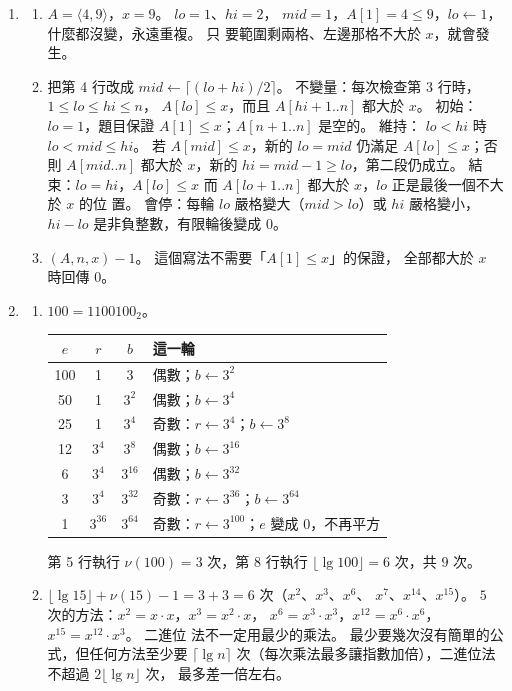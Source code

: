 \begin{enumerate}
\item
\begin{enumerate}
\item $A = \langle 4, 9 \rangle$，$x = 9$。 $\mathit{lo} = 1$、$\mathit{hi} = 2$，
$\mathit{mid} = 1$，$A[1] = 4 \le 9$，$\mathit{lo} \gets 1$，什麼都沒變，永遠重複。 只
要範圍剩兩格、左邊那格不大於 $x$，就會發生。
\item 把第 4 行改成 $\mathit{mid} \gets \lceil (\mathit{lo} + \mathit{hi}) / 2
\rceil$。 不變量：每次檢查第 3 行時，$1 \le \mathit{lo} \le \mathit{hi} \le n$，
$A[\mathit{lo}] \le x$，而且 $A[\mathit{hi}+1..n]$ 都大於 $x$。 初始：
$\mathit{lo} = 1$，題目保證 $A[1] \le x$；$A[n+1..n]$ 是空的。 維持：
$\mathit{lo} < \mathit{hi}$ 時 $\mathit{lo} < \mathit{mid} \le \mathit{hi}$。 若
$A[\mathit{mid}] \le x$，新的 $\mathit{lo} = \mathit{mid}$ 仍滿足 $A[\mathit{lo}] \le
x$；否則 $A[\mathit{mid}..n]$ 都大於 $x$，新的 $\mathit{hi} = \mathit{mid} - 1 \ge
\mathit{lo}$，第二段仍成立。 結束：$\mathit{lo} = \mathit{hi}$，$A[\mathit{lo}] \le
x$ 而 $A[\mathit{lo}+1..n]$ 都大於 $x$，$\mathit{lo}$ 正是最後一個不大於 $x$ 的位
置。 會停：每輪 $\mathit{lo}$ 嚴格變大（$\mathit{mid} > \mathit{lo}$）或
$\mathit{hi}$ 嚴格變小，$\mathit{hi} - \mathit{lo}$ 是非負整數，有限輪後變成 $0$。
\item {}$(A, n, x) - 1$。 這個寫法不需要「$A[1] \le x$」的保證，
全部都大於 $x$ 時回傳 $0$。
\end{enumerate}

\item
\begin{enumerate}
\item $100 = 1100100_2$。
\begin{center}
\begin{tabular}{cccl}
\toprule
$e$ & $r$ & $b$ & 這一輪 \\
\midrule
100 & 1 & $3$ & 偶數；$b \gets 3^2$ \\
50 & 1 & $3^2$ & 偶數；$b \gets 3^4$ \\
25 & 1 & $3^4$ & 奇數：$r \gets 3^4$；$b \gets 3^8$ \\
12 & $3^4$ & $3^8$ & 偶數；$b \gets 3^{16}$ \\
6 & $3^4$ & $3^{16}$ & 偶數；$b \gets 3^{32}$ \\
3 & $3^4$ & $3^{32}$ & 奇數：$r \gets 3^{36}$；$b \gets 3^{64}$ \\
1 & $3^{36}$ & $3^{64}$ & 奇數：$r \gets 3^{100}$；$e$ 變成 $0$，不再平方 \\
\bottomrule
\end{tabular}
\end{center}
第 5 行執行 $\nu(100) = 3$ 次，第 8 行執行 $\lfloor \lg 100 \rfloor = 6$ 次，共 $9$ 次。
\item $\lfloor \lg 15 \rfloor + \nu(15) - 1 = 3 + 3 = 6$ 次（$x^2$、$x^3$、$x^6$、
$x^7$、$x^{14}$、$x^{15}$）。 $5$ 次的方法：$x^2 = x \cdot x$，$x^3 = x^2 \cdot x$，
$x^6 = x^3 \cdot x^3$，$x^{12} = x^6 \cdot x^6$，$x^{15} = x^{12} \cdot x^3$。 二進位
法不一定用最少的乘法。 最少要幾次沒有簡單的公式，但任何方法至少要 $\lceil \lg n
\rceil$ 次（每次乘法最多讓指數加倍），二進位法不超過 $2\lfloor \lg n \rfloor$ 次，
最多差一倍左右。
\end{enumerate}


\end{enumerate}
